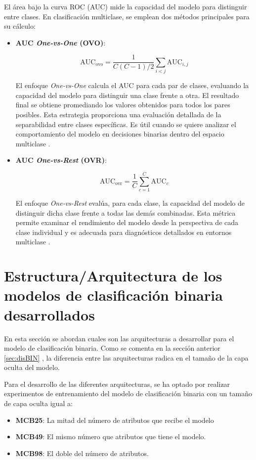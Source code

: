 El área bajo la curva ROC (AUC) mide la capacidad del modelo para distinguir entre clases. En clasificación multiclase, se emplean dos métodos principales para su cálculo:

\begin{itemize}

\item \textbf{AUC \textit{One-vs-One} (OVO)}:

\begin{equation}
\text{AUC}_{\text{ovo}} = \frac{1}{C(C-1)/2} \sum_{i<j} \text{AUC}_{i,j}
\end{equation}

El enfoque \textit{One-vs-One} calcula el AUC para cada par de clases, evaluando la capacidad del modelo para distinguir una clase frente a otra. El resultado final se obtiene promediando los valores obtenidos para todos los pares posibles. Esta estrategia proporciona una evaluación detallada de la separabilidad entre clases específicas. Es útil cuando se quiere analizar el comportamiento del modelo en decisiones binarias dentro del espacio multiclase \cite{Hsu2002}.

\item \textbf{AUC \textit{One-vs-Rest} (OVR)}:

\begin{equation}
\text{AUC}_{\text{ovr}} = \frac{1}{C} \sum_{c=1}^{C} \text{AUC}_c
\end{equation}

El enfoque \textit{One-vs-Rest} evalúa, para cada clase, la capacidad del modelo de distinguir dicha clase frente a todas las demás combinadas. Esta métrica permite examinar el rendimiento del modelo desde la perspectiva de cada clase individual y es adecuada para diagnósticos detallados en entornos multiclase \cite{Rifkin2004}.

\end{itemize}


\section{Estructura/Arquitectura de los modelos de clasificación binaria desarrollados}
En esta sección se abordan cuales son las arquitecturas a desarrollar para el modelo de clasificación binaria. Como se comenta en la sección anterior \ref{sec:disBIN} , la diferencia entre las arquitecturas radica en el tamaño de la capa oculta del modelo.

Para el desarrollo de las diferentes arquitecturas, se ha optado por realizar experimentos de entrenamiento del modelo de clasificación binaria con un tamaño de capa oculta igual a:
\begin{itemize}

	\item \textbf{MCB25}: La mitad del número de atributos que recibe el modelo
	\item \textbf{MCB49}: El mismo número que atributos que tiene el modelo.
	\item \textbf{MCB98}: El doble del número de atributos. 

\end{itemize}

